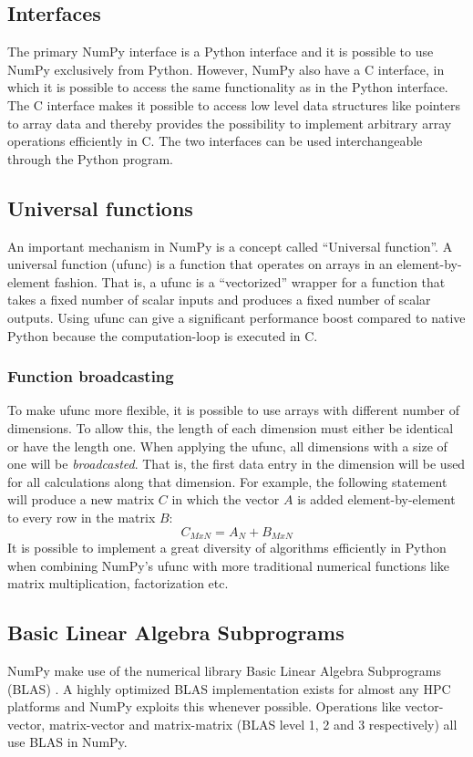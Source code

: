 \documentclass[10pt]{article}
\begin{document}
\subsection{Interfaces}
The primary NumPy interface is a Python interface and it is possible to use NumPy exclusively from Python. However, NumPy also have a C interface, in which it is possible to access the same functionality as in the Python interface. The C interface makes it possible to access low level data structures like pointers to array data and thereby provides the possibility to implement arbitrary array operations efficiently in C. The two interfaces can be used interchangeable through the Python program.

\subsection{Universal functions}
An important mechanism in NumPy is a concept called “Universal function”. A universal function (ufunc) is a function that operates on arrays in an element-by-element fashion. That is, a ufunc is a “vectorized” wrapper for a function that takes a fixed number of scalar inputs and produces a fixed number of scalar outputs. Using ufunc can give a significant performance boost compared to native Python because the computation-loop is executed in C.

\subsubsection{Function broadcasting}
To make ufunc more flexible, it is possible to use arrays with different number of dimensions. To allow this, the length of each dimension must either be identical or have the length one. When applying the ufunc, all dimensions with a size of one will be \emph{broadcasted}. That is, the first data entry in the dimension will be used for all calculations along that dimension. For example, the following statement will produce a new matrix $C$ in which the vector $A$ is added element-by-element to every row in the matrix $B$: \[C_{MxN} = A_N+B_{MxN}\]
It is possible to implement a great diversity of algorithms efficiently in Python when combining NumPy's ufunc with more traditional numerical functions like matrix multiplication, factorization etc.


\subsection{Basic Linear Algebra Subprograms}
NumPy make use of the numerical library Basic Linear Algebra Subprograms (BLAS) \cite{blas79}. A highly optimized BLAS implementation exists for almost any HPC platforms and NumPy exploits this whenever possible. Operations like vector-vector, matrix-vector and matrix-matrix (BLAS level 1, 2 and 3 respectively) all use BLAS in NumPy. 
\end{document}
